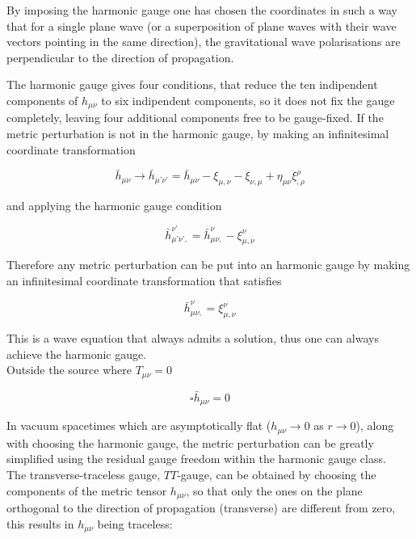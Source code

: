 \documentclass[binding=0.6cm, LaM]{sapthesis}
\begin{document}
	By imposing the harmonic gauge one has chosen the coordinates in such a way that for a single plane wave 
	(or a superposition of plane waves with their wave vectors pointing in the same direction),
	the gravitational wave  polarisations are perpendicular to the direction of propagation.

	The harmonic gauge gives four conditions, that reduce the ten indipendent components of  
	$h_{\mu\nu}$ to six indipendent components, so it does not fix the gauge completely,
	leaving four additional components free to be gauge-fixed.
	If the metric perturbation is not in the harmonic gauge, by making an infinitesimal coordinate transformation

		\begin{equation}
		{\bar h}_{\mu\nu} \rightarrow {\bar h}_{\mu’\nu’}  = {\bar h}_{\mu\nu}  - \xi_{\mu,\nu} -\xi_{\nu,\mu} + \eta_{\mu\nu}\xi^{\rho}_{,\rho}
		\end{equation}

	and applying the harmonic gauge condition

		\begin{equation}
		{\bar h}_{\mu’\nu’,} ^{\nu’} = {\bar h}_{\mu\nu,} ^{\nu} - \xi_{\mu,\nu}^{\nu}
		\end{equation}

	Therefore any metric perturbation can be put into an harmonic gauge by making an infinitesimal 
	coordinate transformation that satisfies

		\begin{equation}
		{\bar h}_{\mu\nu,} ^{\nu} = \xi_{\mu,\nu}^{\nu}
		\end{equation}

	This is a wave equation that always admits a solution, thus one can always achieve the harmonic gauge. \\
	Outside the source where $T_{\mu\nu} = 0$

		\begin{equation}
		\square {\bar h}_{\mu\nu} = 0
		\end{equation}

	In vacuum spacetimes which are asymptotically flat ($h_{\mu\nu} \rightarrow 0$ as $r \rightarrow 0$), 
	along with choosing the harmonic gauge, the metric perturbation can be greatly simplified using
	the residual gauge freedom within the harmonic gauge class. \\
	The transverse-traceless gauge, $TT$-gauge, can be obtained by choosing the components of the metric tensor $h_{\mu\nu}$,
	so that only the ones on the plane orthogonal to the direction of propagation (transverse) 
	are different from zero, this results in $h_{\mu\nu}$ being traceless:
\end{document}
